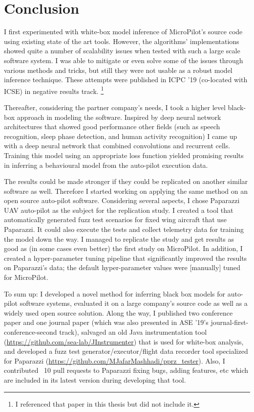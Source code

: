 \chapter{Conclusion} \label{sec:summary} %
I first experimented with white-box model inference of MicroPilot's source code using existing state of the art tools. 
However, the algorithms' implementations showed quite a number of scalability issues when tested with such a large scale software system. I was able to mitigate or even solve some of the issues through various methods and tricks, but still they were not usable as a robust model inference technique. These attempts were published in ICPC '19 (co-located with ICSE) in negative results track. \footnote{I referenced that paper \cite{mashhadi2019empirical} in this thesis but did not include it.}

Thereafter, considering the partner company's needs, I took a higher level black-box approach in modeling the software. Inspired by deep neural network architectures that showed good performance other fields (such as speech recognition, sleep phase detection, and human activity recognition) I came up with a deep neural network that combined convolutions and recurrent cells. Training this model using an appropriate loss function yielded promising results in inferring a behavioural model from the auto-pilot execution data.

The results could be made stronger if they could be replicated on another similar software as well. Therefore I started working on applying the same method on an open source auto-pilot software. Considering several aspects, I chose Paparazzi UAV auto-pilot as the subject for the replication study. I created a tool that automatically generated fuzz test scenarios for fixed wing aircraft that use Paparazzi. It could also execute the tests and collect telemetry data for training the model down the way. 
I managed to replicate the study and get results as good as (in some cases even better) the first study on MicroPilot. In addition, I created a hyper-parameter tuning pipeline that significantly improved the results on Paparazzi's data; the default hyper-parameter values were [manually] tuned for MicroPilot.

To sum up: I developed a novel method for inferring black box models for auto-pilot software systems, evaluated it on a large company's source code as well as a widely used open source solution. Along the way, I published two conference paper and one journal paper (which was also presented in ASE '19's journal-first-conference-second track), salvaged an old Java instrumentation tool (\url{https://github.com/sea-lab/JInstrumenter}) that is used for white-box analysis, and developed a fuzz test generator/executor/flight data recorder tool specialized for Paparazzi (\url{https://github.com/MJafarMashhadi/pprz_tester}). Also, I contributed ~10 pull requests to Paparazzi fixing bugs, adding features, etc which are included in its latest version during developing that tool.


